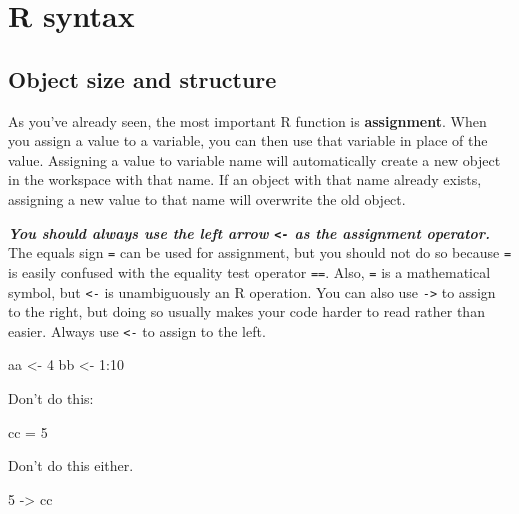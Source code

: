 \documentclass[
  13,
  letterpaper,
]{report}
\newenvironment{Shaded}{\begin{snugshade}}{\end{snugshade}}
\newcommand{\DecValTok}[1]{\textcolor[rgb]{0.68,0.00,0.00}{#1}}
\newcommand{\NormalTok}[1]{\textcolor[rgb]{0.00,0.23,0.31}{#1}}
\newcommand{\OtherTok}[1]{\textcolor[rgb]{0.00,0.23,0.31}{#1}}
\newcommand{\SpecialCharTok}[1]{\textcolor[rgb]{0.37,0.37,0.37}{#1}}
\begin{document}
\section{R syntax}\label{sec-02-syn}

\subsection{Object size and structure}\label{sec-02-syn-oss}

As you've already seen, the most important R function is
\textbf{assignment}. When you assign a value to a variable, you can then
use that variable in place of the value. Assigning a value to variable
name will automatically create a new object in the workspace with that
name. If an object with that name already exists, assigning a new value
to that name will overwrite the old object.

\textbf{\emph{You should always use the left arrow \texttt{\textless{}-}
as the assignment operator.}} The equals sign \texttt{=} can be used for
assignment, but you should not do so because \texttt{=} is easily
confused with the equality test operator \texttt{==}. Also, \texttt{=}
is a mathematical symbol, but \texttt{\textless{}-} is unambiguously an
R operation. You can also use \texttt{-\textgreater{}} to assign to the
right, but doing so usually makes your code harder to read rather than
easier. Always use \texttt{\textless{}-} to assign to the left.

\begin{Shaded}
\begin{Highlighting}[]
\NormalTok{aa }\OtherTok{\textless{}{-}} \DecValTok{4}
\NormalTok{bb }\OtherTok{\textless{}{-}} \DecValTok{1}\SpecialCharTok{:}\DecValTok{10}
\end{Highlighting}
\end{Shaded}

Don't do this:

\begin{Shaded}
\begin{Highlighting}[]
\NormalTok{cc }\OtherTok{=} \DecValTok{5}
\end{Highlighting}
\end{Shaded}

Don't do this either.

\begin{Shaded}
\begin{Highlighting}[]
\DecValTok{5} \OtherTok{{-}\textgreater{}}\NormalTok{ cc}
\end{Highlighting}
\end{Shaded}
\end{document}
